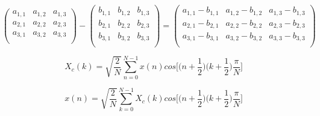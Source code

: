 \documentclass{article}
\begin{document}
\[\begin{pmatrix}
 a_{1,1} & a_{1,2} & a_{1,3} \\
 a_{2,1} & a_{2,2} & a_{2,3} \\
 a_{3,1} & a_{3,2} & a_{3,3} \\
\end{pmatrix}
-
\begin{pmatrix}
 b_{1,1} & b_{1,2} & b_{1,3} \\
 b_{2,1} & b_{2,2} & b_{2,3} \\
 b_{3,1} & b_{3,2} & b_{3,3} \\
\end{pmatrix}
=
\begin{pmatrix}
 a_{1,1}-b_{1,1} & a_{1,2}-b_{1,2} & a_{1,3}-b_{1,3} \\
 a_{2,1}-b_{2,1} & a_{2,2}-b_{2,2} & a_{2,3}-b_{2,3} \\
 a_{3,1}-b_{3,1} & a_{3,2}-b_{3,2} & a_{3,3}-b_{3,3} \\
\end{pmatrix}
\]
\pagebreak

\[                 X_c(k) = \sqrt{\frac{2}{N}}\sum_{n=0}^{N-1} x(n)cos\Big[\Big(n+\frac{1}{2}\Big)\Big(k+\frac{1}{2}\Big)\frac{\pi}{N}\Big]
\]
\pagebreak

\[                 x(n) = \sqrt{\frac{2}{N}}\sum_{k=0}^{N-1} X_c(k)cos\Big[\Big(n+\frac{1}{2}\Big)\Big(k+\frac{1}{2}\Big)\frac{\pi}{N}\Big]
\]
\pagebreak
\end{document}
